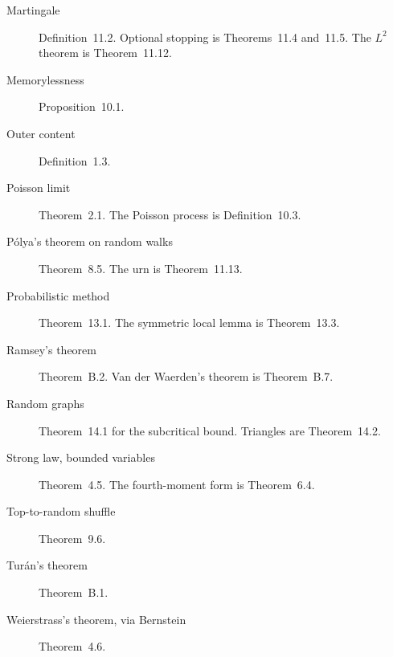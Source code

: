 \begin{description}
\item[Martingale] Definition~11.2. Optional stopping is Theorems~11.4 and~11.5. The $L^2$ theorem is Theorem~11.12.
\item[Memorylessness] Proposition~10.1.
\item[Outer content] Definition~1.3.
\item[Poisson limit] Theorem~2.1. The Poisson process is Definition~10.3.
\item[P\'olya's theorem on random walks] Theorem~8.5. The urn is Theorem~11.13.
\item[Probabilistic method] Theorem~13.1. The symmetric local lemma is Theorem~13.3.
\item[Ramsey's theorem] Theorem~B.2. Van der Waerden's theorem is Theorem~B.7.
\item[Random graphs] Theorem~14.1 for the subcritical bound. Triangles are Theorem~14.2.
\item[Strong law, bounded variables] Theorem~4.5. The fourth-moment form is Theorem~6.4.
\item[Top-to-random shuffle] Theorem~9.6.
\item[Tur\'an's theorem] Theorem~B.1.
\item[Weierstrass's theorem, via Bernstein] Theorem~4.6.
\end{description}
